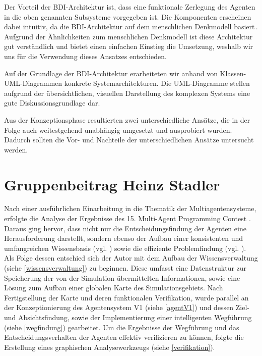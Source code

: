 \documentclass[runningheads]{llncs}
\begin{document}
Der Vorteil der BDI-Architektur ist, dass eine funktionale Zerlegung des Agenten in die oben genannten Subsysteme vorgegeben ist. Die Komponenten erscheinen dabei intuitiv, da die BDI-Architektur auf dem menschlichen Denkmodell basiert\,\cite{Weiss2000}. Aufgrund der Ähnlichkeiten zum menschlichen Denkmodell ist diese Architektur gut verständlich und bietet einen einfachen Einstieg die Umsetzung, weshalb wir uns für die Verwendung dieses Ansatzes entschieden.

Auf der Grundlage der BDI-Architektur erarbeiteten wir anhand von Klassen-UML-Diagrammen konkrete Systemarchitekturen. Die UML-Diagramme stellen aufgrund der übersichtlichen, visuellen Darstellung des komplexen Systems eine gute Diskussionsgrundlage dar.

Aus der Konzeptionsphase resultierten zwei unterschiedliche Ansätze, die in der Folge auch weitestgehend unabhängig umgesetzt und ausprobiert wurden. Dadurch sollten die Vor- und Nachteile der unterschiedlichen Ansätze untersucht werden.


\section{Gruppenbeitrag Heinz Stadler}
Nach einer ausführlichen Einarbeitung in die Thematik der Multiagentensysteme, erfolgte die Analyse der Ergebnisse des 15. Multi-Agent Programming Contest \cite{Ahlbrecht2021}. Daraus ging hervor, dass nicht nur die Entscheidungsfindung der Agenten eine Herausforderung darstellt, sondern ebenso der Aufbau einer konsistenten und umfangreichen Wissensbasis (vgl. \cite[S. 29]{Ahlbrecht2021}) sowie die effiziente Problemfindung (vgl. \cite[S. 17]{Ahlbrecht2021}). \\
Als Folge dessen entschied sich der Autor mit dem Aufbau der Wissensverwaltung (siehe \ref{wissensverwaltung}) zu beginnen. Diese umfasst eine Datenstruktur zur Speicherung der von der Simulation übermittelten Informationen, sowie eine Lösung zum Aufbau einer globalen Karte des Simulationsgebiets. Nach Fertigstellung der Karte und deren funktionalen Verifikation, wurde parallel an der Konzeptionierung des Agentensystem V1 (siehe \ref{agentV1}) und dessen Ziel- und Absichtsfindung, sowie der Implementierung einer intelligenten Wegführung (siehe \ref{wegfindung}) gearbeitet. Um die Ergebnisse der Wegführung und das Entscheidungsverhalten der Agenten effektiv verifizieren zu können, folgte die Erstellung eines graphischen Analysewerkzeugs (siehe \ref{verifikation}).
 
\end{document}
